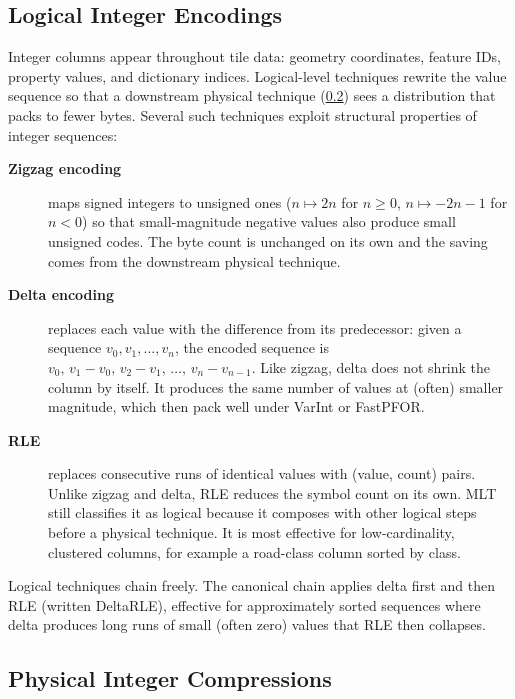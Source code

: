 \subsection{Logical Integer Encodings}\label{sub:logical_integer_encodings}

Integer columns appear throughout tile data: geometry coordinates, feature IDs, property values, and dictionary indices.
Logical-level techniques rewrite the value sequence so that a downstream physical technique (\cref{sub:physical_integer_compressions}) sees a distribution that packs to fewer bytes.
Several such techniques exploit structural properties of integer sequences:

\begin{description}
    \item[\textbf{Zigzag encoding}] maps signed integers to unsigned ones ($n \mapsto 2n$ for $n \geq 0$, $n \mapsto -2n-1$ for $n < 0$) so that small-magnitude negative values also produce small unsigned codes.
    The byte count is unchanged on its own and the saving comes from the downstream physical technique.

    \item[\textbf{Delta encoding}] replaces each value with the difference from its predecessor: given a sequence $v_0, v_1, \ldots, v_n$, the encoded sequence is $v_0,\, v_1 - v_0,\, v_2 - v_1,\, \ldots,\, v_n - v_{n-1}$.
    Like zigzag, delta does not shrink the column by itself.
    It produces the same number of values at (often) smaller magnitude, which then pack well under VarInt or FastPFOR.

    \item[\textbf{\acf{RLE}}] replaces consecutive runs of identical values with (value, count) pairs.
    Unlike zigzag and delta, RLE reduces the symbol count on its own.
    MLT still classifies it as logical because it composes with other logical steps before a physical technique.
    It is most effective for low-cardinality, clustered columns, for example a road-class column sorted by class.
\end{description}

Logical techniques chain freely.
The canonical chain applies delta first and then \ac{RLE} (written DeltaRLE), effective for approximately sorted sequences where delta produces long runs of small (often zero) values that \ac{RLE} then collapses.

\subsection{Physical Integer Compressions}\label{sub:physical_integer_compressions}

